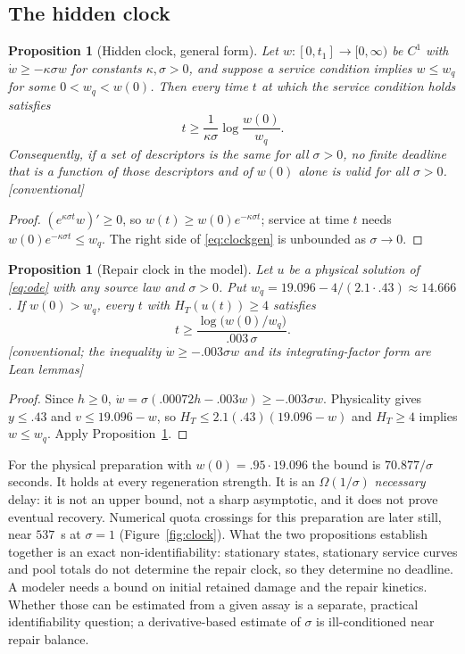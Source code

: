 \documentclass[11pt,a4paper]{article}
\theoremstyle{plain}
\newtheorem{proposition}[theorem]{Proposition}
\theoremstyle{definition}
\theoremstyle{remark}
\newcommand{\HT}{H_T}
\newcommand{\evid}[1]{\textnormal{\textsf{\small[#1]}}}
\begin{document}
\subsection{The hidden clock}

\begin{proposition}[Hidden clock, general form]\label{prop:clockgen}
Let $w:[0,t_1]\to[0,\infty)$ be $C^1$ with $\dot w\ge-\kappa\sigma w$ for
constants $\kappa,\sigma>0$, and suppose a service condition implies
$w\le w_q$ for some $0<w_q<w(0)$. Then every time $t$ at which the service
condition holds satisfies
\begin{equation}\label{eq:clockgen}
t\ge\frac{1}{\kappa\sigma}\log\frac{w(0)}{w_q}.
\end{equation}
Consequently, if a set of descriptors is the same for all $\sigma>0$, no
finite deadline that is a function of those descriptors and of $w(0)$ alone is
valid for all $\sigma>0$. \evid{conventional}
\end{proposition}
\begin{proof}
$(e^{\kappa\sigma t}w)'\ge0$, so $w(t)\ge w(0)e^{-\kappa\sigma t}$; service at
time $t$ needs $w(0)e^{-\kappa\sigma t}\le w_q$. The right side of
\eqref{eq:clockgen} is unbounded as $\sigma\to0$.
\end{proof}

\begin{proposition}[Repair clock in the model]\label{prop:clock}
Let $u$ be a physical solution of \eqref{eq:ode} with any source law and
$\sigma>0$. Put $w_q=19.096-4/(2.1\cdot.43)\approx14.666$. If $w(0)>w_q$,
every $t$ with $\HT(u(t))\ge4$ satisfies
\begin{equation}\label{eq:clock}
t\ge\frac{\log\bigl(w(0)/w_q\bigr)}{.003\,\sigma}.
\end{equation}
\evid{conventional; the inequality $\dot w\ge-.003\sigma w$ and its
integrating-factor form are Lean lemmas}
\end{proposition}
\begin{proof}
Since $h\ge0$, $\dot w=\sigma(.00072h-.003w)\ge-.003\sigma w$. Physicality
gives $y\le.43$ and $v\le19.096-w$, so $\HT\le2.1(.43)(19.096-w)$ and
$\HT\ge4$ implies $w\le w_q$. Apply Proposition~\ref{prop:clockgen}.
\end{proof}

For the physical preparation with $w(0)=.95\cdot19.096$ the bound is
$70.877/\sigma$ seconds. It holds at every regeneration strength. It is an
$\Omega(1/\sigma)$ \emph{necessary} delay: it is not an upper bound, not a sharp
asymptotic, and it does not prove eventual recovery. Numerical quota crossings
for this preparation are later still, near $537$~s at $\sigma=1$
(Figure~\ref{fig:clock}). What the two propositions establish together is an
exact non-identifiability: stationary states, stationary service curves and
pool totals do not determine the repair clock, so they determine no deadline.
A modeler needs a bound on initial retained damage and the repair kinetics.
Whether those can be estimated from a given assay is a separate, practical
identifiability question; a derivative-based estimate of $\sigma$ is
ill-conditioned near repair balance.
\end{document}
